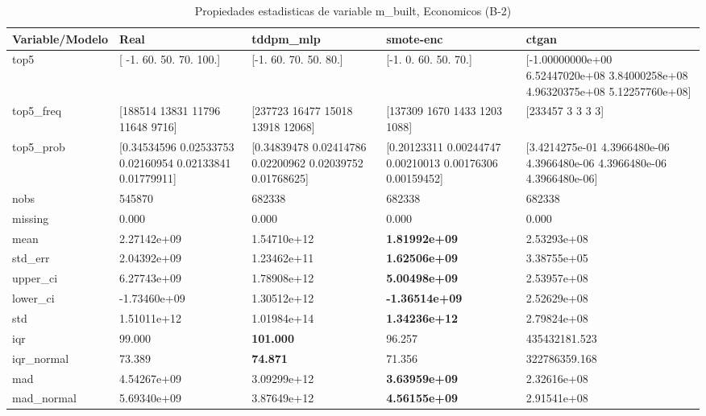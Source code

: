 \begin{table}[H]
\centering
\fontsize{8}{14}\selectfont
\caption{Propiedades  estadisticas de variable m\_built, Economicos (B-2)}
\label{table-stats-economicos-b-2-m_built}
\begin{tabular}{|l|m{10em}|m{10em}|m{10em}|m{10em}|}
\hline
 \rowcolor[gray]{0.8}
Variable/Modelo & Real & tddpm\_mlp & smote-enc & ctgan \\
\hline top5 & [ -1.  60.  50.  70. 100.] & [-1. 60. 70. 50. 80.] & [-1.  0. 60. 50. 70.] & [-1.00000000e+00  6.52447020e+08  3.84000258e+08  4.96320375e+08
  5.12257760e+08] \\
\hline top5\_freq & [188514  13831  11796  11648   9716] & [237723  16477  15018  13918  12068] & [137309   1670   1433   1203   1088] & [233457      3      3      3      3] \\
\hline top5\_prob & [0.34534596 0.02533753 0.02160954 0.02133841 0.01779911] & [0.34839478 0.02414786 0.02200962 0.02039752 0.01768625] & [0.20123311 0.00244747 0.00210013 0.00176306 0.00159452] & [3.4214275e-01 4.3966480e-06 4.3966480e-06 4.3966480e-06 4.3966480e-06] \\
\hline nobs & 545870 & 682338 & 682338 & 682338 \\
\hline missing & 0.000 & 0.000 & 0.000 & 0.000 \\
\hline mean & 2.27142e+09 & \cellcolor[rgb]{0.9, 0.54, 0.52} 1.54710e+12 & \bfseries 1.81992e+09 & 2.53293e+08 \\
\hline std\_err & 2.04392e+09 & \cellcolor[rgb]{0.9, 0.54, 0.52} 1.23462e+11 & \bfseries 1.62506e+09 & 3.38755e+05 \\
\hline upper\_ci & 6.27743e+09 & \cellcolor[rgb]{0.9, 0.54, 0.52} 1.78908e+12 & \bfseries 5.00498e+09 & 2.53957e+08 \\
\hline lower\_ci & -1.73460e+09 & \cellcolor[rgb]{0.9, 0.54, 0.52} 1.30512e+12 & \bfseries -1.36514e+09 & 2.52629e+08 \\
\hline std & 1.51011e+12 & \cellcolor[rgb]{0.9, 0.54, 0.52} 1.01984e+14 & \bfseries 1.34236e+12 & 2.79824e+08 \\
\hline iqr & 99.000 & \bfseries 101.000 & 96.257 & \cellcolor[rgb]{0.9, 0.54, 0.52} 435432181.523 \\
\hline iqr\_normal & 73.389 & \bfseries 74.871 & 71.356 & \cellcolor[rgb]{0.9, 0.54, 0.52} 322786359.168 \\
\hline mad & 4.54267e+09 & \cellcolor[rgb]{0.9, 0.54, 0.52} 3.09299e+12 & \bfseries 3.63959e+09 & 2.32616e+08 \\
\hline mad\_normal & 5.69340e+09 & \cellcolor[rgb]{0.9, 0.54, 0.52} 3.87649e+12 & \bfseries 4.56155e+09 & 2.91541e+08 \\

\end{tabular}
\end{table}
